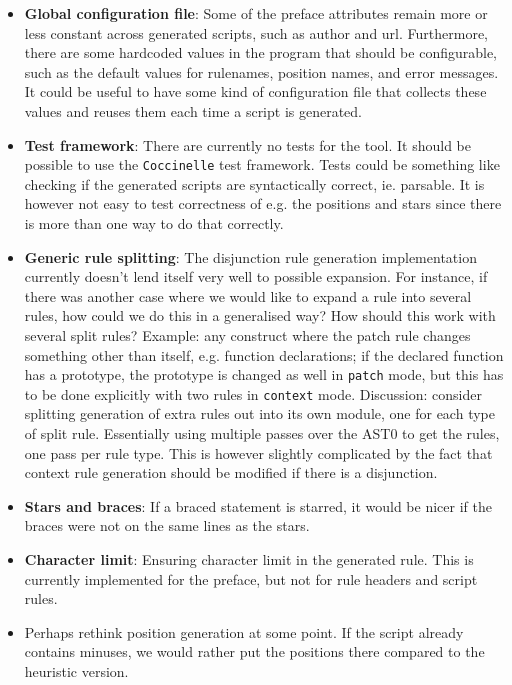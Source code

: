 \begin{itemize}
\item \textbf{Global configuration file}: Some of the preface attributes remain more or less constant across generated scripts, such as author and url. Furthermore, there are some hardcoded values in the program that should be configurable, such as the default values for rulenames, position names, and error messages.\newline
It could be useful to have some kind of configuration file that collects these values and reuses them each time a script is generated.
\item \textbf{Test framework}: There are currently no tests for the tool. It should be possible to use the \texttt{Coccinelle} test framework. Tests could be something like checking if the generated scripts are syntactically correct, ie. parsable. It is however not easy to test correctness of e.g. the positions and stars since there is more than one way to do that correctly.
\item \textbf{Generic rule splitting}: The disjunction rule generation implementation currently doesn't lend itself very well to possible expansion. For instance, if there was another case where we would like to expand a rule into several rules, how could we do this in a generalised way? How should this work with several split rules?\newline
Example: any construct where the patch rule changes something other than itself, e.g. function declarations; if the declared function has a prototype, the prototype is changed as well in \texttt{patch} mode, but this has to be done explicitly with two rules in \texttt{context} mode.\newline
Discussion: consider splitting generation of extra rules out into its own module, one for each type of split rule. Essentially using multiple passes over the AST0 to get the rules, one pass per rule type. This is however slightly complicated by the fact that context rule generation should be modified if there is a disjunction.
\item \textbf{Stars and braces}: If a braced statement is starred, it would be nicer if the braces were not on the same lines as the stars.
\item \textbf{Character limit}: Ensuring character limit in the generated rule. This is currently implemented for the preface, but not for rule headers and script rules.
\item Perhaps rethink position generation at some point. If the script already contains minuses, we would rather put the positions there compared to the heuristic version.
\end{itemize}

